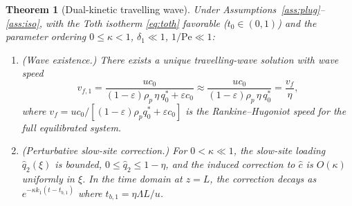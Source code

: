 \documentclass[a4paper]{amsart}
\newtheorem{theorem}{Theorem}
\theoremstyle{definition}
\begin{document}
\begin{theorem}[Dual-kinetic travelling wave]\label{thm:wave}
  Under Assumptions~\ref{ass:plug}--\ref{ass:iso}, with the Toth isotherm
  \eqref{eq:toth} favorable ($t_0\in(0,1)$) and the parameter ordering
  $0\leq\kappa<1$, $\delta_1\ll1$, $1/\mathrm{Pe}\ll1$:
  \begin{enumerate}
    \item[\emph{(i)}] \emph{(Wave existence.)}  There exists a unique
      travelling-wave solution with wave speed
      \begin{equation}
        v_{f,1} = \frac{uc_0}{(1-\varepsilon)\rho_p\,\eta\, q_0^*+\varepsilon c_0}
                 \approx \frac{uc_0}{(1-\varepsilon)\rho_p\,\eta\,q_0^*}
                 = \frac{v_f}{\eta},
        \label{eq:vf1}
      \end{equation}
      where $v_f = uc_0/[(1-\varepsilon)\rho_p q_0^*+\varepsilon c_0]$ is the
      Rankine--Hugoniot speed for the full equilibrated system.
    \item[\emph{(ii)}] \emph{(Perturbative slow-site correction.)}  For
      $0<\kappa\ll1$, the slow-site loading $\hat{q}_2(\xi)$ is bounded,
      $0\leq\hat{q}_2\leq 1-\eta$, and the induced correction to $\hat{c}$
      is $O(\kappa)$ uniformly in $\xi$.  In the time domain at $z=L$, the
      correction decays as $e^{-\kappa k_1(t-t_{b,1})}$ where
      $t_{b,1}=\eta\Lambda L/u$.
  \end{enumerate}
\end{theorem}
\end{document}
